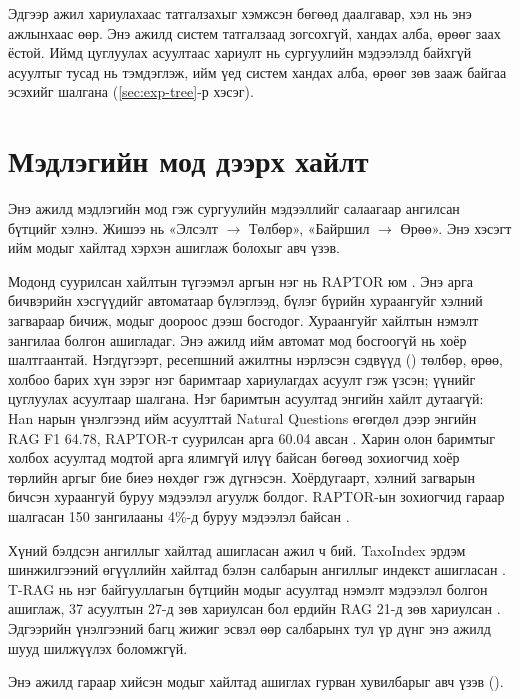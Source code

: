 Эдгээр ажил хариулахаас татгалзахыг хэмжсэн бөгөөд даалгавар, хэл нь энэ ажлынхаас өөр. Энэ ажилд систем татгалзаад зогсохгүй, хандах алба, өрөөг заах ёстой. Иймд цуглуулах асуултаас хариулт нь сургуулийн мэдээлэлд байхгүй асуултыг тусад нь тэмдэглэж, ийм үед систем хандах алба, өрөөг зөв зааж байгаа эсэхийг шалгана (\ref{sec:exp-tree}-р хэсэг).

\section{Мэдлэгийн мод дээрх хайлт}
\label{sec:lit-tree}

Энэ ажилд мэдлэгийн мод гэж сургуулийн мэдээллийг салаагаар ангилсан бүтцийг хэлнэ. Жишээ нь «Элсэлт $\rightarrow$ Төлбөр», «Байршил $\rightarrow$ Өрөө». Энэ хэсэгт ийм модыг хайлтад хэрхэн ашиглаж болохыг авч үзэв.

Модонд суурилсан хайлтын түгээмэл аргын нэг нь RAPTOR юм \cite{sarthi2024raptor}. Энэ арга бичвэрийн хэсгүүдийг автоматаар бүлэглээд, бүлэг бүрийн хураангуйг хэлний загвараар бичиж, модыг доороос дээш босгодог. Хураангуйг хайлтын нэмэлт зангилаа болгон ашигладаг. Энэ ажилд ийм автомат мод босгоогүй нь хоёр шалтгаантай. Нэгдүгээрт, ресепшний ажилтны нэрлэсэн сэдвүүд () төлбөр, өрөө, холбоо барих хүн зэрэг нэг баримтаар хариулагдах асуулт гэж үзсэн; үүнийг цуглуулах асуултаар шалгана. Нэг баримтын асуултад энгийн хайлт дутаагүй: Han нарын үнэлгээнд ийм асуулттай Natural Questions өгөгдөл дээр энгийн RAG F1 64.78, RAPTOR-т суурилсан арга 60.04 авсан \cite{han2025ragvsgraphrag}. Харин олон баримтыг холбох асуултад модтой арга ялимгүй илүү байсан бөгөөд зохиогчид хоёр төрлийн аргыг бие биеэ нөхдөг гэж дүгнэсэн. Хоёрдугаарт, хэлний загварын бичсэн хураангуй буруу мэдээлэл агуулж болдог. RAPTOR-ын зохиогчид гараар шалгасан 150 зангилааны 4\%-д буруу мэдээлэл байсан \cite{sarthi2024raptor}.

Хүний бэлдсэн ангиллыг хайлтад ашигласан ажил ч бий. TaxoIndex эрдэм шинжилгээний өгүүллийн хайлтад бэлэн салбарын ангиллыг индекст ашигласан \cite{kang2024taxoindex}. T-RAG нь нэг байгууллагын бүтцийн модыг асуултад нэмэлт мэдээлэл болгон ашиглаж, 37 асуултын 27-д зөв хариулсан бол ердийн RAG 21-д зөв хариулсан \cite{fatehkia2024trag}. Эдгээрийн үнэлгээний багц жижиг эсвэл өөр салбарынх тул үр дүнг энэ ажилд шууд шилжүүлэх боломжгүй.

Энэ ажилд гараар хийсэн модыг хайлтад ашиглах гурван хувилбарыг авч үзэв ().

